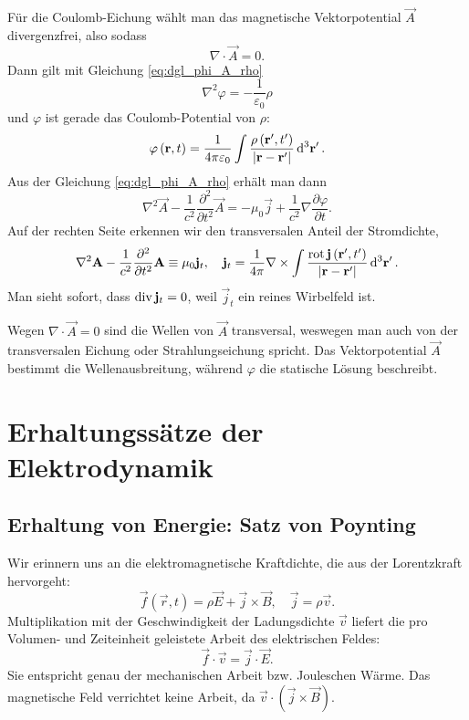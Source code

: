 Für die Coulomb-Eichung wählt man das magnetische Vektorpotential $\vec {A}$ divergenzfrei, also sodass
\begin{equation*}
	\nabla \cdot \vec {A}=0.
\end{equation*}
Dann gilt mit Gleichung \eqref{eq:dgl_phi_A_rho}
\begin{equation*}
	\nabla ^{2}\varphi =-\frac{1}{\varepsilon _{0}}\rho
\end{equation*}
und $\varphi $ ist gerade das Coulomb-Potential von $\rho $:
\begin{equation*}
	\varphi \left(\vec {r},t\right)=\frac{1}{4\pi \varepsilon _{0}}\int \frac{\rho \left(\vec {r}',t'\right)}{\left| \vec {r}-\vec {r}'\right| }\diffa[3]{\vec{r}'}.
\end{equation*}
Aus der Gleichung \eqref{eq:dgl_phi_A_rho} erhält man dann
\begin{equation*}
	\nabla ^{2}\vec {A}-\frac{1}{c^{2}}\frac{\partial ^{2}}{\partial t^{2}}\vec {A}=-\mu _{0}\vec {j}+\frac{1}{c^{2}}\nabla \frac{\partial \varphi }{\partial t}.
\end{equation*}
Auf der rechten Seite erkennen wir den transversalen Anteil der Stromdichte,
\begin{equation*}
	\nabla ^{2}\vec {A}-\frac{1}{c^{2}}\frac{\partial ^{2}}{\partial t^{2}}\vec {A}\equiv\mu _{0}\vec {j}_{t},\quad \vec {j}_{t}=\frac{1}{4\pi }\nabla \times \int \frac{\rot \vec {j}\left(\vec {r}',t'\right)}{\left| \vec {r}-\vec {r}'\right| }\diffa[3]{\vec{r}'}.
\end{equation*}
Man sieht sofort, dass $\divg \vec {j}_{t}=0$, weil $\vec {j}_{t}$ ein reines Wirbelfeld ist.

Wegen $\nabla \cdot \vec {A}=0$ sind die Wellen von $\vec {A}$ transversal, weswegen man auch von der transversalen Eichung oder Strahlungseichung spricht. Das Vektorpotential $\vec {A}$ bestimmt die Wellenausbreitung, während $\varphi $ die statische Lösung beschreibt.

\section{Erhaltungssätze der Elektrodynamik}

\subsection{Erhaltung von Energie: Satz von Poynting\label{sec:satz_von_poynting}}

Wir erinnern uns an die elektromagnetische Kraftdichte, die aus der Lorentzkraft hervorgeht:
\begin{equation*}
	\vec {f}\left(\vec {r},t\right)=\rho \vec {E}+\vec {j}\times \vec {B},\quad \vec {j}=\rho \vec {v}.
\end{equation*}
Multiplikation mit der Geschwindigkeit der Ladungsdichte $\vec {v}$ liefert die pro Volumen- und Zeiteinheit geleistete Arbeit des elektrischen Feldes:
\begin{equation*}
	\vec {f}\cdot \vec {v}=\vec {j}\cdot \vec {E}.
\end{equation*}
Sie entspricht genau der mechanischen Arbeit bzw. Jouleschen Wärme. Das magnetische Feld verrichtet keine Arbeit, da $\vec {v}\cdot \left(\vec {j}\times \vec {B}\right)$.

